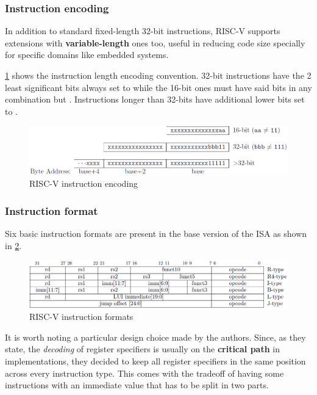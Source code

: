 \documentclass[12pt,oneside,a4paper]{article}
\begin{document}
\subsubsection{Instruction encoding}
In addition to standard fixed-length 32-bit instructions, RISC-V supports extensions with \textbf{variable-length} ones too, useful in reducing code size specially for specific domains like embedded systems.

\cref{riscv:encoding} shows the instruction length encoding convention. 32-bit instructions have the 2 least significant bits always set to {\selectfont{1}} while the 16-bit ones must have said bits in any combination but {\selectfont{11}}.
Instructions longer than 32-bits have additional lower bits set to {\selectfont{1}}.\medskip

\begin{figure}[h]
	\centering
	\includegraphics[scale=0.65]{risc-v_encoding}
	\caption{RISC-V instruction encoding}
	\label{riscv:encoding}
\end{figure}

\subsubsection{Instruction format}
Six basic instruction formats are present in the base version of the ISA as shown in \cref{riscv:format}.

\begin{figure}[h]
	\centering
	\includegraphics[scale=0.65]{risc-v_format}
	\caption{RISC-V instruction formats}
	\label{riscv:format}
\end{figure}

It is worth noting a particular design choice made by the authors. Since, as they state, the \textit{decoding} of register specifiers is usually on the \textbf{critical path} in implementations, they decided to keep all register specifiers in the same position across every instruction type. This comes with the tradeoff of having some instructions with an immediate value that has to be split in two parts.
\end{document}
